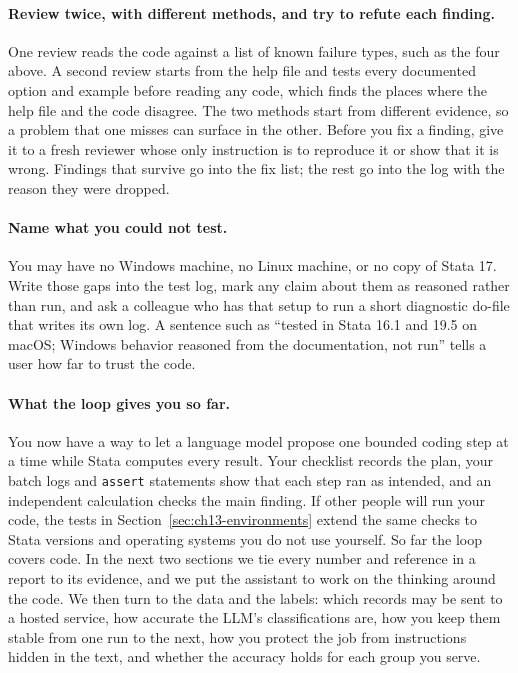 \paragraph{Review twice, with different methods, and try to refute each finding.} One review reads the code against a list of known failure types, such as the four above. A second review starts from the help file and tests every documented option and example before reading any code, which finds the places where the help file and the code disagree. The two methods start from different evidence, so a problem that one misses can surface in the other. Before you fix a finding, give it to a fresh reviewer whose only instruction is to reproduce it or show that it is wrong. Findings that survive go into the fix list; the rest go into the log with the reason they were dropped.

\paragraph{Name what you could not test.} You may have no Windows machine, no Linux machine, or no copy of Stata 17. Write those gaps into the test log, mark any claim about them as reasoned rather than run, and ask a colleague who has that setup to run a short diagnostic do-file that writes its own log. A sentence such as ``tested in Stata 16.1 and 19.5 on macOS; Windows behavior reasoned from the documentation, not run'' tells a user how far to trust the code.

\paragraph{What the loop gives you so far.} You now have a way to let a language model propose one bounded coding step at a time while Stata computes every result. Your checklist records the plan, your batch logs and \texttt{assert} statements show that each step ran as intended, and an independent calculation checks the main finding. If other people will run your code, the tests in Section~\ref{sec:ch13-environments} extend the same checks to Stata versions and operating systems you do not use yourself. So far the loop covers code. In the next two sections we tie every number and reference in a report to its evidence, and we put the assistant to work on the thinking around the code. We then turn to the data and the labels: which records may be sent to a hosted service, how accurate the LLM's classifications are, how you keep them stable from one run to the next, how you protect the job from instructions hidden in the text, and whether the accuracy holds for each group you serve.

